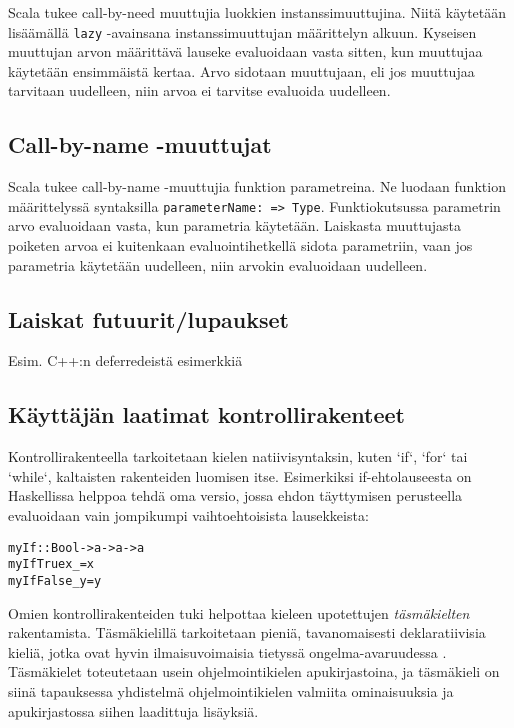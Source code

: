 Scala tukee call-by-need muuttujia luokkien instanssimuuttujina. Niitä käytetään lisäämällä \verb!lazy! -avainsana instanssimuuttujan määrittelyn alkuun. Kyseisen muuttujan arvon määrittävä lauseke evaluoidaan vasta sitten, kun muuttujaa käytetään ensimmäistä kertaa. Arvo sidotaan muuttujaan, eli jos muuttujaa tarvitaan uudelleen, niin arvoa ei tarvitse evaluoida uudelleen.

\subsection{Call-by-name -muuttujat}

Scala tukee call-by-name -muuttujia funktion parametreina. Ne luodaan funktion määrittelyssä syntaksilla \verb!parameterName: => Type!. Funktiokutsussa parametrin arvo evaluoidaan vasta, kun parametria käytetään. Laiskasta muuttujasta poiketen arvoa ei kuitenkaan evaluointihetkellä sidota parametriin, vaan jos parametria käytetään uudelleen, niin arvokin evaluoidaan uudelleen.

\subsection{Laiskat futuurit/lupaukset}

Esim. C++:n deferredeistä esimerkkiä

\subsection{Käyttäjän laatimat kontrollirakenteet}

Kontrollirakenteella tarkoitetaan kielen natiivisyntaksin, kuten `if`, `for` tai `while`, kaltaisten rakenteiden luomisen itse. Esimerkiksi if-ehtolauseesta on Haskellissa helppoa tehdä oma versio, jossa ehdon täyttymisen perusteella evaluoidaan vain jompikumpi vaihtoehtoisista lausekkeista:

\begin{alltt}
% Käyttö: myIf condition onTrue onFalse
myIf :: Bool -> a -> a -> a
myIf True  x _ = x
myIf False _ y = y
\end{alltt}

Omien kontrollirakenteiden tuki helpottaa kieleen upotettujen \textit{täsmäkielten} rakentamista. Täsmäkielillä tarkoitetaan pieniä, tavanomaisesti deklaratiivisia kieliä, jotka ovat hyvin ilmaisuvoimaisia tietyssä ongelma-avaruudessa \citep{van2000domain}. Täsmäkielet toteutetaan usein ohjelmointikielen apukirjastoina, ja täsmäkieli on siinä tapauksessa yhdistelmä ohjelmointikielen valmiita ominaisuuksia ja apukirjastossa siihen laadittuja lisäyksiä.

